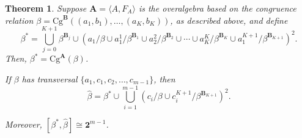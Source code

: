 \documentclass[cm,dissertation,actual,final]{uhthesis}
\theoremstyle{plain}
\newtheorem{theorem}{Theorem}[section]
\theoremstyle{definition}
\theoremstyle{remark}
\numberwithin{theorem}{section}
\numberwithin{claim}{chapter}
\numberwithin{equation}{section}
\numberwithin{conjecture}{chapter}
\newcommand{\<}{\ensuremath{\langle}}
\renewcommand{\>}{\ensuremath{\rangle}}
\newcommand{\Cg}{\ensuremath{\mathrm{Cg}}}
\newcommand{\0}{\ensuremath{\mathbf{0}}}
\newcommand{\1}{\ensuremath{\mathbf{1}}}
\newcommand{\2}{\ensuremath{\mathbf{2}}}
\newcommand{\3}{\ensuremath{\mathbf{3}}}
\newcommand{\4}{\ensuremath{\mathbf{4}}}
\newcommand{\5}{\ensuremath{\mathbf{5}}}
\newcommand{\bA}{\ensuremath{\mathbf{A}}}
\newcommand{\bB}{\ensuremath{\mathbf{B}}}
\newcommand{\two}{\ensuremath{\mathbf{2}}}
\begin{document}
\begin{theorem}
  \label{OAthm3}
  Suppose $\bA = \< A, F_A\>$ is the overalgebra
  based on the congruence relation $\beta = \Cg^{\bB}((a_1, b_1), \dots, (a_K,b_K))$, as described above,
  and define
  \[ \beta^* = \bigcup_{j=0}^{K+1} \beta^{\bB_j} \cup 
  (a_1/\beta \cup a_1^1/\beta^{\bB_1} \cup a_2^2/\beta^{\bB_2}    \cup \cdots \cup a_K^K/\beta^{\bB_K}\cup a_1^{K+1}/\beta^{\bB_{K+1}})^2.
  \]
  Then, $\beta^* = \Cg^{\bA}(\beta)$.  

  If $\beta$ has transversal $\{a_1, c_1, c_2, \dots, c_{m-1}\}$, then
  \begin{equation}
    \label{eq:OA312}
    \widehat{\beta} = \beta^* \cup \bigcup_{i=1}^{m-1} (c_i/\beta \cup
    c^{K+1}_i/\beta^{\bB_{K+1}})^2.
  \end{equation}

  Moreover, $[\beta^*, \widehat{\beta}] \cong \two^{m-1}$.
\end{theorem}
\end{document}
